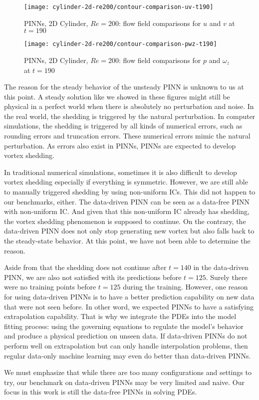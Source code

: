 \begin{figure}[hbt!]
    \texttt{[image: cylinder-2d-re200/contour-comparison-uv-t190]}
    \caption{PINNs, 2D Cylinder, $Re=200$: flow field comparisons for $u$ and $v$ at $t=190$}
    \label{fig:cylinder-re200-contour-uv-t190}
\end{figure}

\begin{figure}[hbt!]
    \texttt{[image: cylinder-2d-re200/contour-comparison-pwz-t190]}
    \caption{PINNs, 2D Cylinder, $Re=200$: flow field comparisons for $p$ and $\omega_z$ at $t=190$}
    \label{fig:cylinder-re200-contour-pwz-t190}
\end{figure}

The reason for the steady behavior of the unsteady PINN is unknown to us at this point.
A steady solution like we showed in these figures might still be physical in a perfect world when there is absolutely no perturbation and noise.
In the real world, the shedding is triggered by the natural perturbation.
In computer simulations, the shedding is triggered by all kinds of numerical errors, such as rounding errors and truncation errors.
These numerical errors mimic the natural perturbation.
As errors also exist in PINNs, PINNs are expected to develop vortex shedding.

In traditional numerical simulations, sometimes it is also difficult to develop vortex shedding especially if everything is symmetric.
However, we are still able to manually triggered shedding by using non-uniform ICs.
This did not happen to our benchmarks, either.
The data-driven PINN can be seen as a data-free PINN with non-uniform IC.
And given that this non-uniform IC already has shedding, the vortex shedding phenomenon is supposed to continue.
On the contrary, the data-driven PINN does not only stop generating new vortex but also falls back to the steady-state behavior.
At this point, we have not been able to determine the reason.

Aside from that the shedding does not continue after $t=140$ in the data-driven PINN, we are also not satisfied with its predictions before $t=125$.
Surely there were no training points before $t=125$ during the training.
However, one reason for using data-driven PINNs is to have a better prediction capability on new data that were not seen before.
In other word, we expected PINNs to have a satisfying extrapolation capability.
That is why we integrate the PDEs into the model fitting process: using the governing equations to regulate the model's behavior and produce a physical prediction on unseen data.
If data-driven PINNs do not perform well on extrapolation but can only handle interpolation problems, then regular data-only machine learning may even do better than data-driven PINNs.

We must emphasize that while there are too many configurations and settings to try, our benchmark on data-driven PINNs may be very limited and naive.
Our focus in this work is still the data-free PINNs in solving PDEs.
